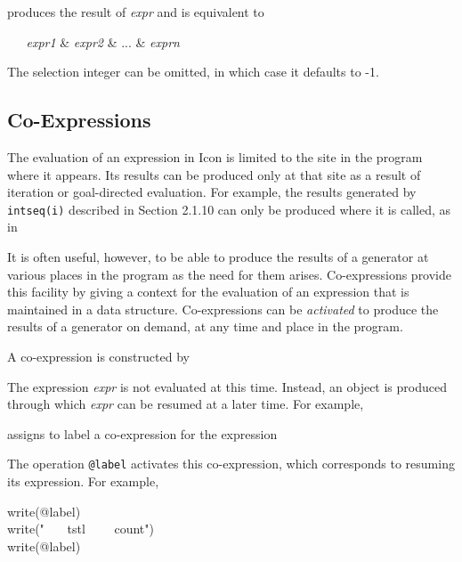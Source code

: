 \noindent
produces the result of \textit{expr} and is equivalent to


\textit{\ \ \ expr1 }\& \textit{expr2 }\& ... \& \textit{exprn}

The selection integer can be omitted, in which case it defaults to -1.


\subsection{Co-Expressions}

\label{Overview-CoExpressions}
The evaluation of an expression in Icon is limited to the site in the
program where it appears. Its results can be produced only at that
site as a result of iteration or goal-directed evaluation. For
example, the results generated by \texttt{intseq(i)} described in
Section 2.1.10 can only be produced where it is called, as in


It is often useful, however, to be able to produce the results of a
generator at various places in the program as the need for them
arises. Co-expressions provide this facility by giving a context for
the evaluation of an expression that is maintained in a data
structure. Co-expressions can be \textit{activated }to produce the
results of a generator on demand, at any time and place in the
program.

A co-expression is constructed by


The expression \textit{expr} is not evaluated at this time. Instead,
an object is produced through which \textit{expr} can be resumed at a
later time. For example,


\noindent assigns to label a co-expression for the expression


\noindent
The operation \texttt{@label} activates this co-expression, which
corresponds to resuming its expression. For example,

\begin{iconcode}
\>write(@label)\\
\>write(" \ \ \ tstl \ \ \ \ count")\\
\>write(@label)
\end{iconcode}

